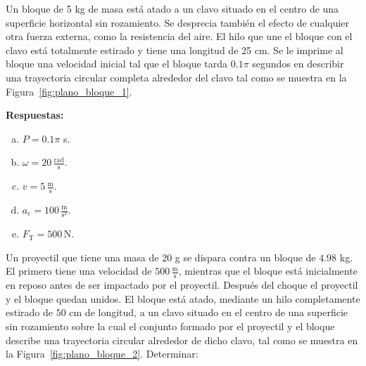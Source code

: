 \documentclass[addpoints]{exam}
\newcommand{\rtas}{\textbf{Respuestas: }}
\begin{document}
\begin{questions}
    \question Un bloque de 5 kg de masa está atado a un clavo situado en el centro de una superficie horizontal sin rozamiento. Se desprecia también el efecto de cualquier otra fuerza externa, como la resistencia del aire. El hilo que une el bloque con el clavo está totalmente estirado y tiene una longitud de 25 cm. Se le imprime al bloque una velocidad inicial tal que el bloque tarda $0.1 \pi$ segundos en describir una trayectoria circular completa alrededor del clavo tal como se muestra en la Figura~\ref{fig:plano_bloque_1}. \label{ej:plano_bloque_1}


    \rtas
    \begin{enumerate}[a)]
        \item $P = 0.1 \pi$ s.
        \item $\omega = 20 \, \frac{\text{rad}}{\text{s}}$.
        \item $v = 5 \, \frac{\text{m}}{\text{s}}$.
        \item $a_\text{c} = 100 \, \frac{\text{m}}{\text{s}^2}$.
        \item $F_\text{T} = 500 \, \text{N}$.
    \end{enumerate}

    \question Un proyectil que tiene una masa de 20 g se dispara contra un bloque de $4.98$ kg. El primero tiene una velocidad de $500 \, \frac{\text{m}}{\text{s}}$, mientras que el bloque está inicialmente en reposo antes de ser impactado por el proyectil. Después del choque el proyectil y el bloque quedan unidos. El bloque está atado, mediante un hilo completamente estirado de $50$ cm de longitud, a un clavo situado en el centro de una superficie sin rozamiento sobre la cual el conjunto formado por el proyectil y el bloque describe una trayectoria circular alrededor de dicho clavo, tal como se muestra en la Figura~\ref{fig:plano_bloque_2}. Determinar: \label{ej:plano_bloque_2}
    \begin{parts}

\end{parts}
\end{questions}
\end{document}
